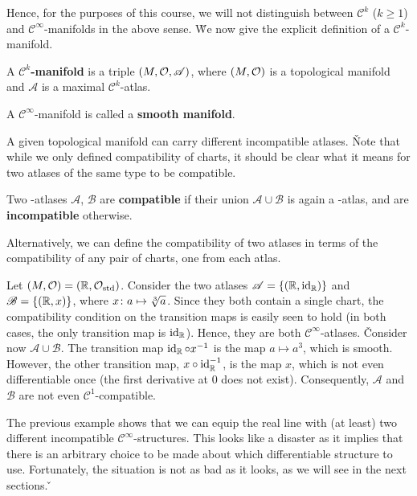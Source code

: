 Hence, for the purposes of this course, we will not distinguish between $\mathcal{C}^k$ ($k\geq 1$) and
$\mathcal{C}^\infty$-manifolds in the above sense. \v

We now give the explicit definition of a $\mathcal{C}^k$-manifold.

A $\mathcal{C}^k$\textbf{-manifold} is a triple $(M,\mathcal{O},\mathscr{A})$, where $(M,\mathcal{O})$ is a topological manifold and
$\mathscr{A}$ is a maximal $\mathcal{C}^k$-atlas.
\ed

A $\mathcal{C}^\infty$-manifold is called a \textbf{smooth manifold}.
\ed

A given topological manifold can carry different incompatible atlases. \v

Note that while we only defined compatibility of charts, it should be clear what it means for two atlases of the same
type to be compatible.

Two {\scalebox{0.75}\FiveFlowerOpen}-atlases $\mathscr{A}$, $\mathscr{B}$ are \textbf{compatible} if their union
$\mathscr{A}\cup\mathscr{B}$ is again a {\scalebox{0.75}\FiveFlowerOpen}-atlas, and are \textbf{incompatible} otherwise.
\ed

Alternatively, we can define the compatibility of two atlases in terms of the compatibility of any pair of charts,
one from each atlas.

\be
Let $(M,\mathcal{O})=(\mathbb{R},\mathcal{O}_\mathrm{std})$. Consider the two atlases $\mathscr{A}=\{(\mathbb{R},\operatorname{id}_{\mathbb{R}})\}$ and $\mathscr{B}=\{(\mathbb{R},x)
\}$, where $x\colon a \mapsto \sqrt[3]{a}$. Since they both contain a single chart, the compatibility condition on the
transition maps is easily seen to hold (in both cases, the only transition map is $\operatorname{id}_{\mathbb{R}}$). Hence, they are both
$\mathcal{C}^\infty$-atlases. \v

Consider now $\mathscr{A}\cup\mathscr{B}$. The transition map $\operatorname{id}_{\mathbb{R}}\circ x^{-1}$ is the map $a\mapsto a^3$, which
is smooth. However, the other transition map, $x\circ\operatorname{id}_{\mathbb{R}}^{-1}$, is the map $x$, which is not even differentiable
once (the first derivative at $0$ does not exist). Consequently, $\mathscr{A}$ and $\mathscr{B}$ are not even
$\mathcal{C}^1$-compatible.
\ee

The previous example shows that we can equip the real line with (at least) two different incompatible
$\mathcal{C}^\infty$-structures. This looks like a disaster as it implies that there is an arbitrary choice to be
made about which differentiable structure to use. Fortunately, the situation is not as bad as it looks, as we will
see in the next sections. \v

